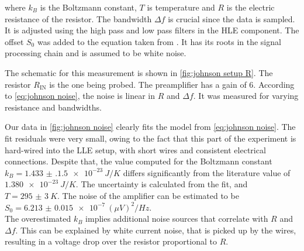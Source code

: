 \documentclass[
    parskip=half, 
    twoside=false,
    twocolumn=true,
    fontsize=11pt,
]{scrarticle}
\begin{document}
where $k_B$ is the Boltzmann constant, $T$ is temperature and $R$ is the electric resistance of the resistor. The bandwidth $\Delta f$ is crucial since the data is sampled. It is adjusted using the high pass and low pass filters in the HLE component. The offset $S_0$ was added to the equation taken from \autocite{Buch}. It has its roots in the signal processing chain and is assumed to be white noise. 

The schematic for this measurement is shown in \autoref{fig:johnson setup R}. The resistor $R_\text{IN}$ is the one being probed. The preamplifier has a gain of $6$.  According to \autoref{eq:johnson noise}, the noise is linear in $R$ and $\Delta f$. It was measured for varying resistance and bandwidths.

Our data in \autoref{fig:johnson noise} clearly fits the model from \autoref{eq:johnson noise}.
The fit residuals were very small, owing to the fact that this part of the experiment is hard-wired into the LLE setup, with short wires and consistent electrical connections.
Despite that, the value computed for the Boltzmann constant $k_B = \SI{1.433(1.5)e-23}{J/K}$ differs significantly from the literature value of $\SI{1.380e-23}{J/K}$. 
The uncertainty is calculated from the fit, and $T = \SI{295(3)}{K}$.
The noise of the amplifier can be estimated to be $S_0 = \SI{6.213(15)e-7}{(\mu V)^2/Hz}$.\\
The overestimated $k_B$ implies additional noise sources that correlate with $R$ and $\Delta f$.
This can be explained by white current noise, that is picked up by the wires, resulting in a voltage drop over the resistor proportional to $R$.
\end{document}
